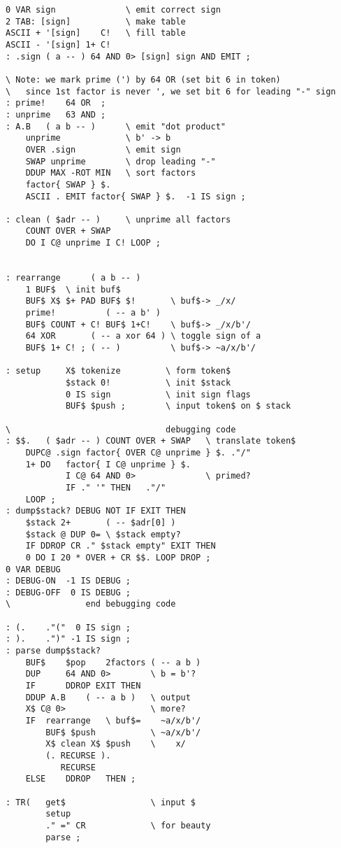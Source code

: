 \begin{lstlisting}
0 VAR sign              \ emit correct sign
2 TAB: [sign]           \ make table
ASCII + '[sign]    C!   \ fill table
ASCII - '[sign] 1+ C!
: .sign ( a -- ) 64 AND 0> [sign] sign AND EMIT ;

\ Note: we mark prime (') by 64 OR (set bit 6 in token)
\   since 1st factor is never ', we set bit 6 for leading "-" sign
: prime!    64 OR  ;
: unprime   63 AND ;
: A.B   ( a b -- )      \ emit "dot product"
    unprime             \ b' -> b
    OVER .sign          \ emit sign
    SWAP unprime        \ drop leading "-"
    DDUP MAX -ROT MIN   \ sort factors
    factor{ SWAP } $.
    ASCII . EMIT factor{ SWAP } $.  -1 IS sign ;

: clean ( $adr -- )     \ unprime all factors
    COUNT OVER + SWAP
    DO I C@ unprime I C! LOOP ;


: rearrange      ( a b -- )
    1 BUF$  \ init buf$
    BUF$ X$ $+ PAD BUF$ $!       \ buf$-> _/x/
    prime!          ( -- a b' )
    BUF$ COUNT + C! BUF$ 1+C!    \ buf$-> _/x/b'/
    64 XOR       ( -- a xor 64 ) \ toggle sign of a
    BUF$ 1+ C! ; ( -- )          \ buf$-> ~a/x/b'/

: setup     X$ tokenize         \ form token$
            $stack 0!           \ init $stack
            0 IS sign           \ init sign flags
            BUF$ $push ;        \ input token$ on $ stack

\                               debugging code
: $$.   ( $adr -- ) COUNT OVER + SWAP   \ translate token$
    DUPC@ .sign factor{ OVER C@ unprime } $. ."/"
    1+ DO   factor{ I C@ unprime } $.
            I C@ 64 AND 0>              \ primed?
            IF ." '" THEN   ."/"
    LOOP ;
: dump$stack? DEBUG NOT IF EXIT THEN
    $stack 2+       ( -- $adr[0] )
    $stack @ DUP 0= \ $stack empty?
    IF DDROP CR ." $stack empty" EXIT THEN
    0 DO I 20 * OVER + CR $$. LOOP DROP ;
0 VAR DEBUG
: DEBUG-ON  -1 IS DEBUG ;
: DEBUG-OFF  0 IS DEBUG ;
\               end bebugging code

: (.    ."("  0 IS sign ;
: ).    .")" -1 IS sign ;
: parse dump$stack?
    BUF$    $pop    2factors ( -- a b )
    DUP     64 AND 0>        \ b = b'?
    IF      DDROP EXIT THEN
    DDUP A.B    ( -- a b )   \ output
    X$ C@ 0>                 \ more?
    IF  rearrange   \ buf$=    ~a/x/b'/
        BUF$ $push           \ ~a/x/b'/
        X$ clean X$ $push    \    x/
        (. RECURSE ).
           RECURSE
    ELSE    DDROP   THEN ;

: TR(   get$                 \ input $
        setup
        ." =" CR             \ for beauty
        parse ;
\end{lstlisting}

